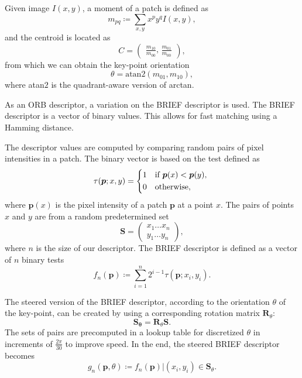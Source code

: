 Given image $I(x,y)$, a moment of a patch is defined as
\begin{equation}
    m_{pq}\coloneqq\sum_{x,y} x^p y^q I(x,y),
\end{equation}
and the centroid is located as
\begin{equation}
    C =
    \begin{pmatrix}
        \frac{m_{10}}{m_{00}} \text{, } \frac{m_{01}}{m_{00}}
    \end{pmatrix},
\end{equation}
from which we can obtain the key-point orientation
\begin{equation}
    \theta = \text{atan}2(m_{01},m_{10}),
\end{equation}
where atan$2$ is the quadrant-aware version of arctan.

As an ORB descriptor, a variation on the BRIEF descriptor is used. The BRIEF descriptor is a vector of binary values. This allows for fast matching using a Hamming distance.

The descriptor values are computed by comparing random pairs of pixel intensities in a patch. The binary vector is based on the test defined as
\begin{equation}
    \tau(\boldsymbol{p};x,y)=
    \begin{cases*}
        1 & if $\boldsymbol{p}(x) < \boldsymbol{p}(y)$, \\
        0 & otherwise,
    \end{cases*}
\end{equation}
where $\boldsymbol{p}(x)$ is the pixel intensity of a patch $\boldsymbol{p}$ at a point $x$. The pairs of points $x$ and $y$ are from a random predetermined set
\begin{equation}
    \boldsymbol{S} =
    \begin{pmatrix}
        x_1 \dots x_n \\
        y_1 \dots y_n
    \end{pmatrix},
\end{equation}
where $n$ is the size of our descriptor. The BRIEF descriptor is defined as a vector of $n$ binary tests
\begin{equation}
    f_n(\boldsymbol{p}) \coloneqq \sum_{i=1}^{n} 2^{i-1}\tau(\boldsymbol{p};x_i, y_i).
\end{equation}

The steered version of the BRIEF descriptor, according to the orientation $\theta$ of the key-point, can be created by using a corresponding rotation matrix $\boldsymbol{R}_\theta$:
\begin{equation}
    \boldsymbol{S_\theta} = \boldsymbol{R}_\theta \boldsymbol{S}.
\end{equation}
The sets of pairs are precomputed in a lookup table for discretized $\theta$ in increments of $\frac{2\pi}{30}$ to improve speed. In the end, the steered BRIEF descriptor becomes
\begin{equation}
    g_n(\boldsymbol{p}, \theta) \coloneqq f_n(\boldsymbol{p}) | (x_i, y_i) \in \boldsymbol{S}_\theta.
\end{equation}
